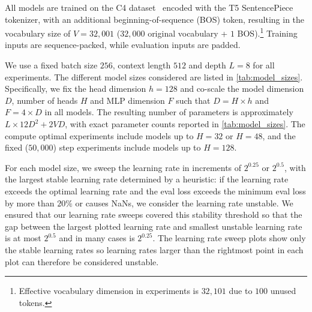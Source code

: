 \documentclass{article}
\theoremstyle{plain}
\theoremstyle{definition}
\theoremstyle{remark}
\begin{document}
All models are trained on the C4 dataset~\citep{t5} encoded with the T5 SentencePiece~\citep{kudo2018sentencepiece} tokenizer, with an additional beginning-of-sequence (BOS) token, resulting in the vocabulary size of $V = 32,001$ ($32,000$ original vocabulary + $1$ BOS).\footnote{Effective vocabulary dimension in experiments is $32,101$ due to $100$ unused tokens.} Training inputs are sequence-packed, while evaluation inputs are padded.

We use a fixed batch size $256$, context length $512$ and depth $L=8$ for all experiments. The different model sizes considered are listed in \cref{tab:model_sizes}. Specifically, we fix the head dimension $h=128$ and co-scale the model dimension $D$, number of heads $H$ and MLP dimension $F$ such that $D = H \times h$ and $F = 4 \times D$ in all models. The resulting number of parameters is approximately $L\times 12 D^2 + 2 V D$, with exact parameter counts reported in \cref{tab:model_sizes}. The compute optimal experiments include models up to $H=32$ or $H=48$, and the fixed ($50{,}000$) step experiments include models up to $H=128$.

For each model size, we sweep the learning rate in increments of $2^{0.25}$ or $2^{0.5}$, with the largest stable learning rate determined by a heuristic: if the learning rate exceeds the optimal learning rate and the eval loss exceeds the minimum eval loss by more than $20\%$ or causes NaNs, we consider the learning rate unstable. We ensured that our learning rate sweeps covered this stability threshold so that the gap between the largest plotted learning rate and smallest unstable learning rate is at most $2^{0.5}$ and in many cases is $2^{0.25}$. The learning rate sweep plots show only the stable learning rates so learning rates larger than the rightmost point in each plot can therefore be considered unstable.
\end{document}
